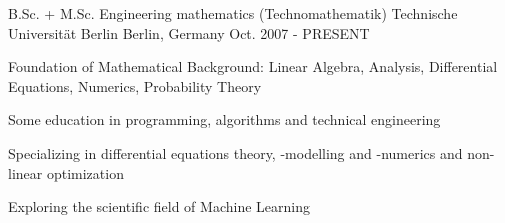 


\begin{cventries}


\cventry
{B.Sc. + M.Sc. Engineering mathematics (Technomathematik)} %
{Technische Universität Berlin} %
{Berlin, Germany} %
{Oct. 2007 - PRESENT} %
{ %
\begin{cvitems}
\item {Foundation of Mathematical Background: Linear Algebra, Analysis, Differential Equations, Numerics, Probability Theory}
\item {Some education in programming, algorithms and technical engineering}
\item {Specializing in differential equations theory, -modelling and -numerics and non-linear optimization}
\item{Exploring the scientific field of Machine Learning}
\end{cvitems}
}


\end{cventries}